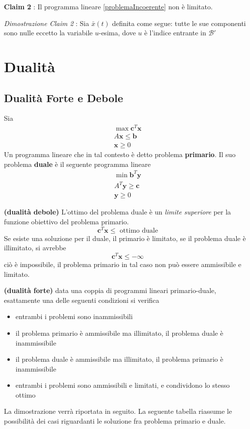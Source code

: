 \documentclass[10pt, letterpaper]{report}
\newcommand{\bc}{{\mathbf{c}}}
\newcommand{\x}{{\mathbf{x}}}
\begin{document}
\bigskip\textbf{Claim 2} : Il programma lineare  \ref{problemaIncoerente} non è limitato.\bigskip 
 
\textit{Dimostrazione Claim 2} : Sia $\bar x(t)$ definita come segue: tutte le sue componenti sono nulle eccetto la variabile $u$-esima, dove $u$ è l'indice entrante in $\mathcal B'$ 
 


\chapter{Dualità}
\section{Dualità Forte e Debole}
\begin{definizione}
    Sia \begin{eqnarray*}
        \max \mathbf c^T\mathbf x\\ 
        A\mathbf x \le \mathbf b \\ 
        \mathbf x \ge 0 
    \end{eqnarray*}
    Un programma lineare che in tal contesto è detto problema \textbf{primario}. Il suo problema \textbf{duale} è il seguente programma lineare 
    \begin{eqnarray*}
        \min \mathbf b^T\mathbf y\\ 
        A^T\mathbf y \ge \mathbf c \\ 
        \mathbf y \ge 0 
    \end{eqnarray*}
\end{definizione}
 \begin{teorema}
    \textbf{(dualità debole)} L'ottimo del problema duale è un \textit{limite superiore} per la funzione obiettivo del problema primario. $$ \bc^T\x\le \text{ ottimo duale}$$Se esiste una soluzione per il duale, il primario è limitato, se il problema duale è illimitato, si avrebbe 
    $$ \bc^T\x\le -\infty$$
    ciò è impossibile, il problema primario in tal caso non può essere ammissibile e limitato.
\end{teorema}
\begin{teorema}\label{dualità forte}
\textbf{(dualità forte)} data una coppia di programmi lineari primario-duale, esattamente una delle seguenti condizioni si verifica\begin{itemize}
    \item entrambi i problemi sono inammissibili 
    \item il problema primario è ammissibile ma illimitato, il problema duale è inammissibile 
    \item il problema duale è ammissibile ma illimitato, il problema primario è inammissibile
    \item entrambi i problemi sono ammissibili e limitati, e condividono lo stesso ottimo
\end{itemize}
\end{teorema}
La dimostrazione verrà riportata in seguito. La seguente tabella riassume le possibilità dei casi riguardanti le soluzione fra problema primario e duale.
\end{document}
